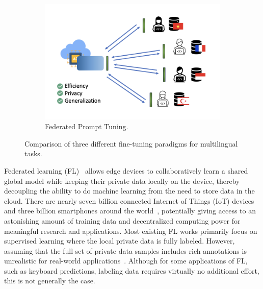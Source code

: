 \documentclass[withindex,glossary]{cam-thesis}
\begin{document}
\begin{figure}
    \begin{minipage}{0.49\linewidth}
        \begin{subfigure}[b]{1.1\linewidth}
            \includegraphics[width=\linewidth]{3.jpg}
            \caption{Federated Prompt Tuning.}
            \label{fig:c}
        \end{subfigure}
    \end{minipage}
    \caption{Comparison of three different fine-tuning paradigms for multilingual tasks. }
    \vspace{-0.5cm}%
    \label{fig:images}
    
\end{figure}
Federated learning (FL)~\citep{fedavg} allows edge devices to collaboratively learn a shared global model while keeping their private data locally on the device, thereby decoupling the ability to do machine learning from the need to store data in the cloud. There are nearly seven billion connected Internet of Things (IoT) devices and three billion smartphones around the world~\citep{lim2020federated}, potentially giving access to an astonishing amount of training data and decentralized computing power for meaningful research and applications. Most existing FL works primarily focus on supervised learning where the local private data is fully labeled. However, assuming that the full set of private data samples includes rich annotations is unrealistic for real-world applications~\citep{fedmatch, semifl, jin2020towards,yang2021federated}. 
Although for some applications of FL, such as keyboard predictions, labeling data requires virtually no additional effort, this is not generally the case. 
\end{document}

